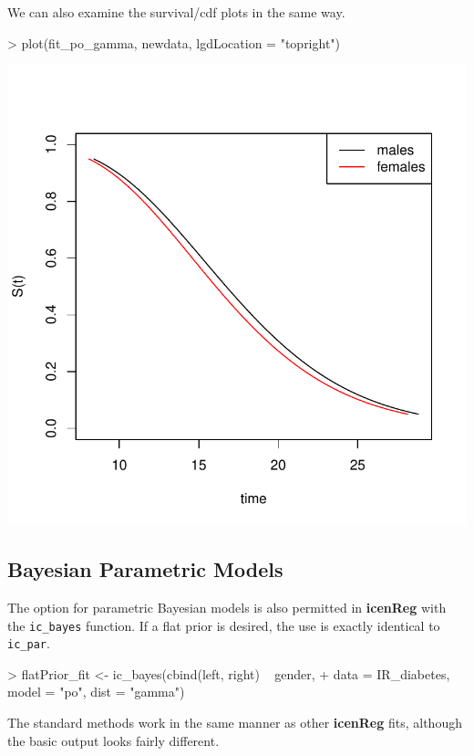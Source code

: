 \documentclass[a4paper]{article}
\begin{document}
  We can also examine the survival/cdf plots in the same way. 
  
\begin{Schunk}
\begin{Sinput}
> plot(fit_po_gamma, newdata, lgdLocation = "topright")
\end{Sinput}
\end{Schunk}
\includegraphics{icenReg-012}

  \subsection{Bayesian Parametric Models}
  
  The option for parametric Bayesian models is also permitted in {\bf icenReg} with the \texttt{ic\_bayes} function. If a flat prior is desired, the use is exactly identical to \texttt{ic\_par}. 
  
\begin{Schunk}
\begin{Sinput}
> flatPrior_fit <- ic_bayes(cbind(left, right) ~ gender,
+     data = IR_diabetes, model = "po", dist = "gamma")
\end{Sinput}
\end{Schunk}

The standard methods work in the same manner as other {\bf icenReg} fits, although the basic output looks fairly different.
\end{document}
